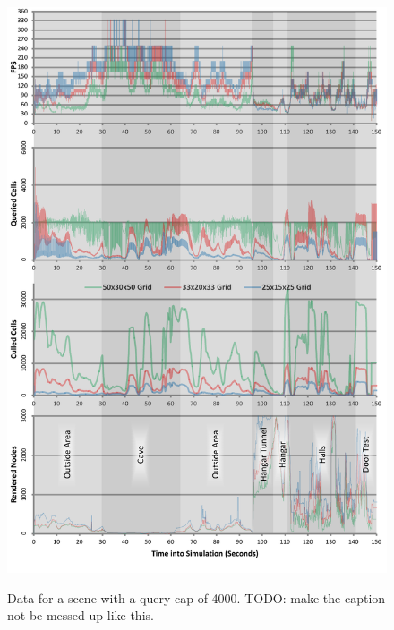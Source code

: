 \documentclass[12pt]{ucthesis}
\newcommand{\captionfonts}{\small\bf\ssp}
\begin{document}
\begin{figure}
\begin{center}
\includegraphics[width=\textwidth]{Images/Graphs/480-4000.pdf}
\label{fig:graph-4000}
\captionfonts
\caption[Query Cap of 4000]{Data for a scene with a query cap of 4000.  TODO: make the caption not be messed up like this.}
\end{center}
\end{figure}
\end{document}
